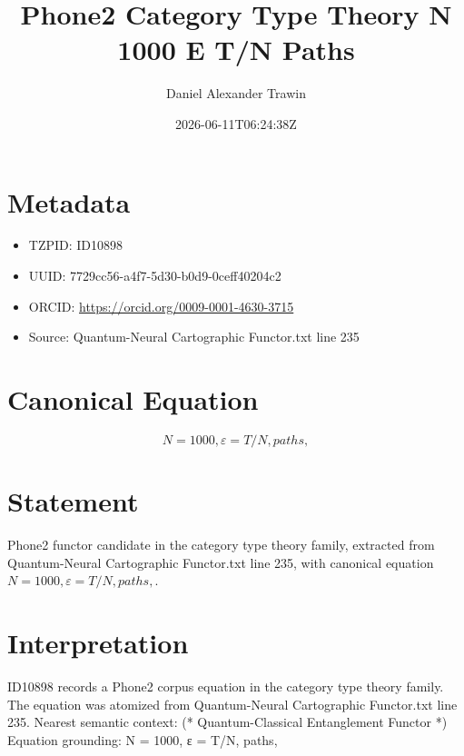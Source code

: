 \documentclass[11pt]{article}
\title{Phone2 Category Type Theory N 1000 Ε T/N Paths}
\author{Daniel Alexander Trawin}
\date{2026-06-11T06:24:38Z}
\begin{document}
\maketitle
\section*{Metadata}
\begin{itemize}
\item TZPID: ID10898
\item UUID: 7729cc56-a4f7-5d30-b0d9-0ceff40204c2
\item ORCID: \url{https://orcid.org/0009-0001-4630-3715}
\item Source: Quantum-Neural Cartographic Functor.txt line 235
\end{itemize}
\section*{Canonical Equation}
\[
{N = 1000, ε = T/N, paths},
\]
\section*{Statement}
Phone2 functor candidate in the category type theory family, extracted from Quantum-Neural Cartographic Functor.txt line 235, with canonical equation ${N = 1000, ε = T/N, paths},$.
\section*{Interpretation}
ID10898 records a Phone2 corpus equation in the category type theory family. The equation was atomized from Quantum-Neural Cartographic Functor.txt line 235. Nearest semantic context: (* Quantum-Classical Entanglement Functor *) Equation grounding: {N = 1000, ε = T/N, paths},
\end{document}
